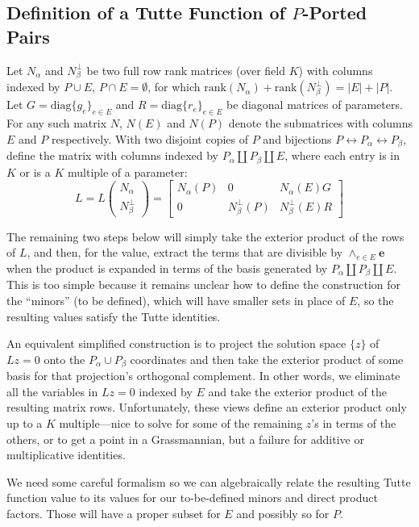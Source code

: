 \documentclass[Unicode]{cedram-alco}
\newcommand{\ext}[1]{\ensuremath{\mathbf{#1}}}
\newcommand{\Nal}{\ensuremath{N_{\alpha}}}
\newcommand{\NbePe}{\ensuremath{N_{\beta}^{\perp}}}
\newcommand{\dunion}{\coprod}
\begin{document}
\subsection{Definition of a Tutte Function of $P$-Ported Pairs}


Let $\Nal$ and $\NbePe$ be two full row rank matrices (over field $K$)
with
columns indexed by $P\cup E$, $P\cap E=\emptyset$, for which
$\text{rank}(\Nal)+\text{rank}(\NbePe)=|E|+|P|$.  Let
$G=\text{diag}\{g_e\}_{e\in E} $ and $R=\text{diag}\{r_e\}_{e\in E} $
be diagonal matrices of parameters.  For any such matrix $N$, $N(E)$ and
$N(P)$ denote the submatrices with columns $E$ and $P$ respectively. With
two disjoint copies of $P$ and bijections
$P \leftrightarrow P_{\alpha}\leftrightarrow P_{\beta}$, define the matrix
with columns indexed by $P_\alpha \dunion P_\beta \dunion E$, where each entry
is in $K$ or is a $K$ multiple of a parameter:
\[
    L = L\left( \begin{array}{c} \Nal\\ \NbePe \end{array} \right)
    = \left[\begin{array}{c|c|c} \Nal(P)  &  0  &  \Nal(E)G \\  \hline
        0  & \NbePe(P)  &  \NbePe(E)R \end{array}\right]
\]

The remaining two steps below will simply take the exterior product of the rows of $L$, and
then, for the value, extract the terms that are divisible by $\wedge_{e \in E}\ext{e}$ when the product
is expanded in terms of the basis generated by $P_\alpha \dunion P_\beta \dunion E$.
This is too simple because it remains unclear how to define the construction for the
``minors'' (to be defined), which will have smaller sets in place of $E$, so the
resulting values satisfy the Tutte identities. 

An equivalent simplified construction is to project the solution space $\{z\}$ of $Lz=0$ onto
the $P_\alpha\cup P_\beta$ coordinates and then take the exterior product of some basis
for that projection's orthogonal complement.  In other words, we eliminate all the variables
in $Lz=0$ indexed by $E$ and take the exterior product of the resulting matrix rows.
Unfortunately, these views define an exterior product only
up to a $K$ multiple---nice to solve for some of the remaining $z$'s in terms of
the others, or to get a point in a Grassmannian, but a failure
for additive or multiplicative identities.

We need 
some careful formalism so we can algebraically relate the resulting Tutte function value
to its values for our to-be-defined minors and direct product factors.  Those 
will have a proper subset for $E$ and possibly so for $P$.
\end{document}

